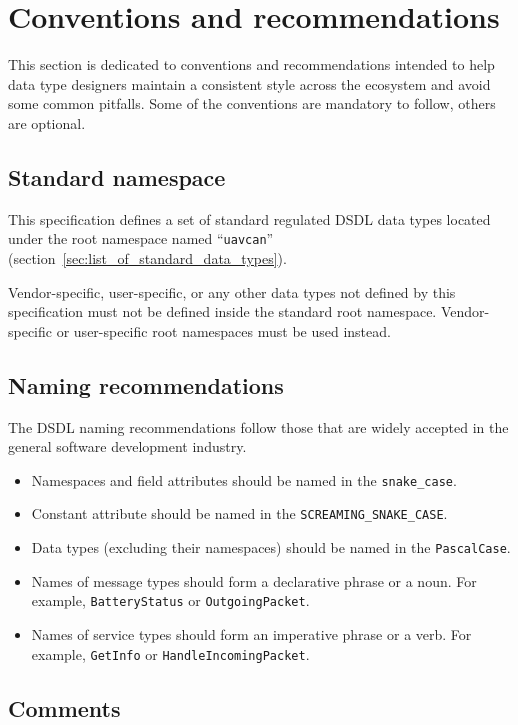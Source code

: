 \section{Conventions and recommendations}

This section is dedicated to conventions and recommendations
intended to help data type designers maintain a consistent style across the ecosystem
and avoid some common pitfalls.
Some of the conventions are mandatory to follow, others are optional.

\subsection{Standard namespace}

This specification defines a set of standard regulated DSDL data types located under
the root namespace named ``\verb"uavcan"'' (section~\ref{sec:list_of_standard_data_types}).

Vendor-specific, user-specific, or any other data types not defined by this specification
must not be defined inside the standard root namespace.
Vendor-specific or user-specific root namespaces must be used instead.

\subsection{Naming recommendations}

The DSDL naming recommendations follow those that are widely accepted in the general software development industry.

\begin{itemize}
    \item Namespaces and field attributes should be named in the \verb|snake_case|.
    \item Constant attribute should be named in the \verb|SCREAMING_SNAKE_CASE|.
    \item Data types (excluding their namespaces) should be named in the \verb|PascalCase|.
    \item Names of message types should form a declarative phrase or a noun. For example,
    \verb|BatteryStatus| or \verb|OutgoingPacket|.
    \item Names of service types should form an imperative phrase or a verb. For example,
    \verb|GetInfo| or \verb|HandleIncomingPacket|.
\end{itemize}

\subsection{Comments}

